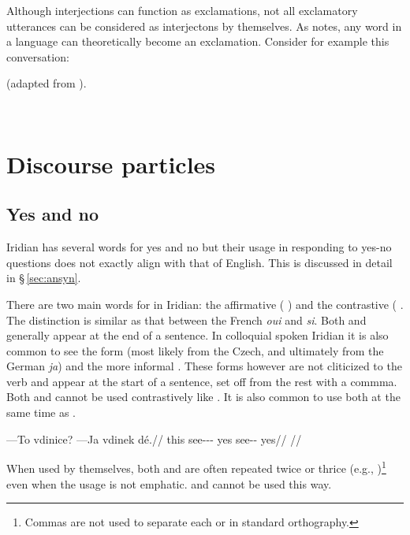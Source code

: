 Although interjections can function as exclamations, not all exclamatory utterances can be considered as interjectons by themselves. As \textcite{jovanovic2004} notes, any word in a language can theoretically become an exclamation. Consider for example this conversation:

\ex (adapted from \cite{jovanovic2004}).\\

  \medskip

  \\
\xe


\section{Discourse particles}

\subsection{Yes and no}
Iridian has several words for yes and no but their usage in responding to yes-no questions does not exactly align with that of English. This is discussed in detail in \S\,\ref{sec:ansyn}.

There are two main words for  in Iridian: the affirmative  ( ) and the contrastive  ( . The distinction is similar as that between the French \emph{oui} and \emph{si}. Both  and  generally appear at the end of a sentence. In colloquial spoken Iridian it is also common to see the form  (most likely from the Czech, and ultimately from the German \emph{ja}) and the more informal . These forms however are not cliticized to the verb and appear at the start of a sentence, set off from the rest with a commma. Both  and  cannot be used contrastively like . It is also common to use both  at the same time as .

\pex
\begingl
\gla ---To vdinice? ---Ja vdinek dé.//
\glb this see-\Pv{}-\Pf{}-\Quot{} yes see-\Pv{}-\Pf{} yes//
\glft {}//
\endgl
\xe

When used by themselves, both  and  are often repeated twice or thrice (e.g., )\footnote{Commas are not used to separate each  or  in standard orthography. } even when the usage is not emphatic.  and  cannot be used this way.

